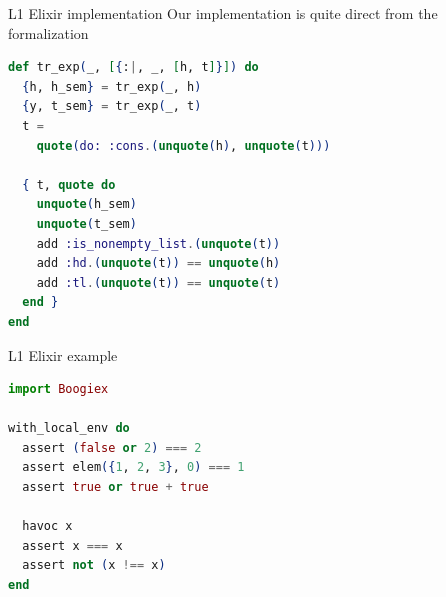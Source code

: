 \documentclass{beamer}
\begin{document}
  \begin{frame}[fragile]{L1 Elixir implementation}
    Our implementation is quite direct from the formalization

    \pause
    \small
    \begin{lstlisting}[language=elixir,numbers=none,frame=none]
def tr_exp(_, [{:|, _, [h, t]}]) do
  {h, h_sem} = tr_exp(_, h)
  {y, t_sem} = tr_exp(_, t)
  t = 
    quote(do: :cons.(unquote(h), unquote(t)))

  { t, quote do
    unquote(h_sem)
    unquote(t_sem)
    add :is_nonempty_list.(unquote(t))
    add :hd.(unquote(t)) == unquote(h)
    add :tl.(unquote(t)) == unquote(t)
  end }
end
    \end{lstlisting}
  \end{frame}
  \begin{frame}[fragile]{L1 Elixir example}
    \small
    \begin{lstlisting}[language=elixir,numbers=none,frame=none]
import Boogiex

with_local_env do
  assert (false or 2) === 2
  assert elem({1, 2, 3}, 0) === 1
  assert true or true + true

  havoc x
  assert x === x
  assert not (x !== x)
end
    \end{lstlisting}
  \end{frame}
\end{document}
